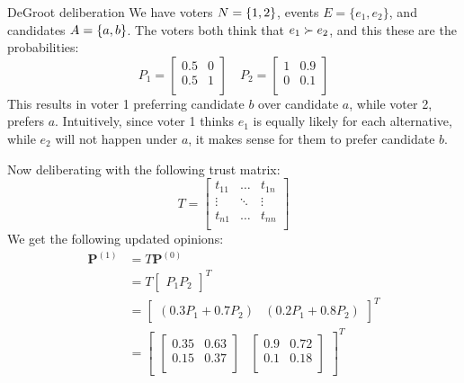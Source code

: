 \begin{example}{DeGroot deliberation}
    {}
    We have voters \(N = \{1,2\}\), events \(E = \{e_{1}, e_{2}\}\), and candidates \(A = \{a,b\}\). The voters both think that \(e_{1} \succ e_{2}\), and this these are the probabilities:
    \[
        P_1 =\begin{bmatrix}
            0.5 & 0 \\
            0.5 & 1 \\
        \end{bmatrix}\quad
        P_2 =\begin{bmatrix}
            1 & 0.9 \\
            0 & 0.1 \\
        \end{bmatrix}
    \]
    This results in voter 1 preferring candidate $b$ over candidate $a$, while voter 2, prefers $a$. Intuitively, since voter 1 thinks $e_{1}$ is equally likely for each alternative, while $e_{2}$ will not happen under $a$, it makes sense for them to prefer candidate $b$.

    Now deliberating with the following trust matrix:
    \[
        T=\begin{bmatrix}
            t_{11} & \dots  & t_{1n} \\
            \vdots & \ddots & \vdots \\
            t_{n1} & \dots  & t_{nn} \\
        \end{bmatrix}
    \]
    We get the following updated opinions:
    \begin{align*}
        \boldsymbol{P}^{(1)} & = T\boldsymbol{P}^{(0)}                                                    \\
                             & =T\begin{bmatrix}P_1 P_2\end{bmatrix}^{T}                                  \\
                             & =\begin{bmatrix}(0.3P_1 + 0.7P_{2}) & (0.2P_1 + 0.8P_{2})\end{bmatrix}^{T} \\
                             & = \begin{bmatrix}
                                     \begin{bmatrix}
                0.35 & 0.63 \\
                0.15 & 0.37 \\
            \end{bmatrix} &
                                     \begin{bmatrix}
                0.9 & 0.72 \\
                0.1 & 0.18 \\
            \end{bmatrix}
                                 \end{bmatrix}^{T}
    \end{align*}


\end{example}
